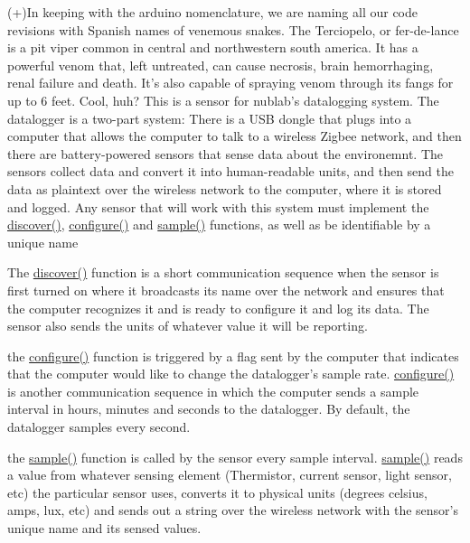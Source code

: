 (+)In keeping with the arduino nomenclature, we are naming all our code revisions with Spanish names of venemous snakes. The Terciopelo, or fer-de-lance is a pit viper common in central and northwestern south america. It has a powerful venom that, left untreated, can cause necrosis, brain hemorrhaging, renal failure and death. It's also capable of spraying venom through its fangs for up to 6 feet. Cool, huh? This is a sensor for nublab's datalogging system. The datalogger is a two-part system: There is a USB dongle that plugs into a computer that allows the computer to talk to a wireless Zigbee network, and then there are battery-powered sensors that sense data about the environemnt. The sensors collect data and convert it into human-readable units, and then send the data as plaintext over the wireless network to the computer, where it is stored and logged. Any sensor that will work with this system must implement the \hyperlink{applet_2nublogger_8h_3fdb2350c3f98c0de0f0ae3c831a8b14}{discover()}, \hyperlink{applet_2nublogger_8h_e369b3765489ee8bd0ea791c1843630f}{configure()} and \hyperlink{temperature__sensor___terciopelo_8cpp_50a2ce599e896bfb535e70a42003ed23}{sample()} functions, as well as be identifiable by a unique name

The \hyperlink{applet_2nublogger_8h_3fdb2350c3f98c0de0f0ae3c831a8b14}{discover()} function is a short communication sequence when the sensor is first turned on where it broadcasts its name over the network and ensures that the computer recognizes it and is ready to configure it and log its data. The sensor also sends the units of whatever value it will be reporting.

the \hyperlink{applet_2nublogger_8h_e369b3765489ee8bd0ea791c1843630f}{configure()} function is triggered by a flag sent by the computer that indicates that the computer would like to change the datalogger's sample rate. \hyperlink{applet_2nublogger_8h_e369b3765489ee8bd0ea791c1843630f}{configure()} is another communication sequence in which the computer sends a sample interval in hours, minutes and seconds to the datalogger. By default, the datalogger samples every second.

the \hyperlink{temperature__sensor___terciopelo_8cpp_50a2ce599e896bfb535e70a42003ed23}{sample()} function is called by the sensor every sample interval. \hyperlink{temperature__sensor___terciopelo_8cpp_50a2ce599e896bfb535e70a42003ed23}{sample()} reads a value from whatever sensing element (Thermistor, current sensor, light sensor, etc) the particular sensor uses, converts it to physical units (degrees celsius, amps, lux, etc) and sends out a string over the wireless network with the sensor's unique name and its sensed values.

